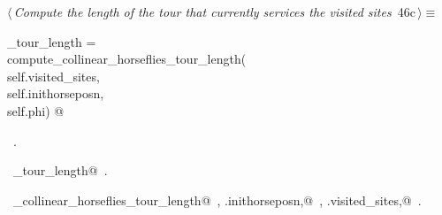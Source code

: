 \documentclass[11.5pt]{report}
\begin{document}
\vspace{-0.8cm}\newchunk 

\begin{flushleft} \small\label{scrap68}\raggedright\small
{} $\langle\,${\itshape Compute the length of the tour that currently services the visited sites}\nobreak\ {\footnotesize {46c}}$\,\rangle\equiv$
\vspace{-1ex}
\begin{list}{}{} \item
\mbox{}\verb@current_tour_length    = \@\\
\mbox{}\verb@         compute_collinear_horseflies_tour_length(\@\\
\mbox{}\verb@                    self.visited_sites,\@\\
\mbox{}\verb@                    self.inithorseposn,\@\\
\mbox{}\verb@                    self.phi) @\\
\mbox{}\verb@@{\NWsep}
\end{list}
\vspace{-1.5ex}
\footnotesize
\begin{list}{}{\setlength{\itemsep}{-\parsep}\setlength{\itemindent}{-\leftmargin}}
\item \NWtxtMacroRefIn\ .
\item \NWtxtIdentsDefed\nobreak\  \verb@current_tour_length@\nobreak\ .\item \NWtxtIdentsUsed\nobreak\  \verb@compute_collinear_horseflies_tour_length@\nobreak\ , \verb@self.inithorseposn,@\nobreak\ , \verb@self.visited_sites,@\nobreak\ .
\item{}
\end{list}
\vspace{4ex}
\end{flushleft}

\vspace{-0.8cm}\newchunk 
\end{document}
